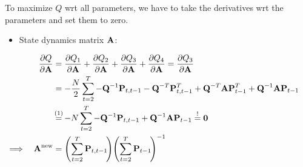 	To maximize \(Q\) \ac{wrt} all parameters, we have to take the derivatives \ac{wrt} the parameters and set them to zero.
	\begin{itemize}
		\item State dynamics matrix \(\boldsymbol{\mathrm{A}}\):
	\end{itemize}
	\begin{align}
		&&\pdv{Q}{\mat{A}}
			&= \pdv{Q_1}{\mat{A}} + \pdv{Q_2}{\mat{A}} + \pdv{Q_3}{\mat{A}} + \pdv{Q_4}{\mat{A}} = \pdv{Q_3}{\mat{A}} & \nonumber \\
		&&	&= -\frac{N}{2} \sum_{t = 2}^{T} -\mat{Q}^{-1} \mat{P}_{t, t - 1} - \mat{Q}^{-T} \mat{P}_{t, t - 1}^T + \mat{Q}^{-T} \mat{A} \mat{P}_{t - 1}^T + \mat{Q}^{-1} \mat{A} \mat{P}_{t - 1} & \nonumber \\
		&&	&\oversetfootnotemark{=} -N \sum_{t = 2}^{T} -\mat{Q}^{-1} \mat{P}_{t, t - 1} + \mat{Q}^{-1} \mat{A} \mat{P}_{t - 1} \overset{!}{=} \mat{0} & \nonumber \\
		\implies && \mat{A}^\new &= \Bigg(\! \sum_{t = 2}^{T} \mat{P}_{t, t - 1} \!\Bigg) \Bigg(\! \sum_{t = 2}^{T} \mat{P}_{t - 1} \!\Bigg)^{-1} & \label{eq:stateDynamicsMatrix}
	\end{align}
	
